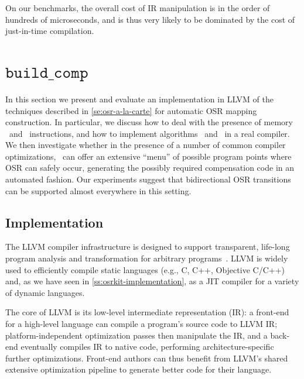 On our benchmarks, the overall cost of IR manipulation is in the order of hundreds of microseconds, and is thus very likely to be dominated by the cost of just-in-time compilation.


\section{\texorpdfstring{$\texttt{build\_comp}$}{build\_comp}}
\label{se:eval-OSR-alC}

In this section we present and evaluate an implementation in LLVM of the techniques described in \mysection\ref{se:osr-a-la-carte} for automatic OSR mapping construction. In particular, we discuss how to deal with the presence of memory \load\ and \store\ instructions, and how to implement algorithms \apply\ and \buildcomp\ in a real compiler. We then investigate whether in the presence of a number of common compiler optimizations, \buildcomp\ can offer an extensive ``menu'' of possible program points where OSR can safely occur, generating the possibly required compensation code in an automated fashion. Our experiments suggest that bidirectional OSR transitions can be supported almost everywhere in this setting.

\subsection{Implementation}
\label{ss:BC-implementation}
The LLVM compiler infrastructure is designed to support transparent, life-long program analysis and transformation for arbitrary programs~\cite{Lattner04}. LLVM is widely used to efficiently compile static languages (e.g., C, C++, Objective C/C++) and, as we have seen in \mysection\ref{ss:osrkit-implementation}, as a JIT compiler for a variety of dynamic languages.

The core of LLVM is its low-level intermediate representation (IR): a front-end for a high-level language can compile a program's source code to LLVM IR; platform-independent optimization passes then manipulate the IR, and a back-end eventually compiles IR to native code, performing architecture-specific further optimizations. Front-end authors can thus benefit from LLVM's shared extensive optimization pipeline to generate better code for their language.

